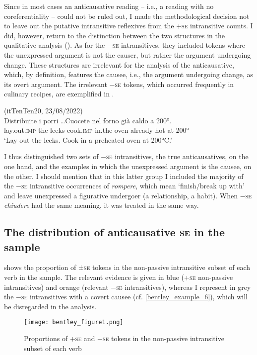 \documentclass[output=paper,colorlinks,citecolor=brown
]{langscibook}
\begin{document}
Since in most cases an anticausative reading – i.e., a reading with no coreferentiality – could not be ruled out, I made the methodological decision not to leave out the putative intransitive reflexives from the +\textsc{se} intransitive counts. I did, however, return to the distinction between the two structures in the qualitative analysis ().
As for the −\textsc{se} intransitives, they included tokens where the unexpressed argument is not the causer, but rather the argument undergoing change. These structures are irrelevant for the analysis of the anticausative, which, by definition, features the causee, i.e., the argument undergoing change, as its overt argument. The irrelevant −\textsc{se} tokens, which occurred frequently in culinary recipes, are exemplified in .


\ea \label{bentley_example_6}(itTenTen20, 23/08/2022)\\
\gll Distribuite i porri  \ldots Cuocete nel forno già caldo a 200°. \\
    lay.out.\textsc{imp}	the	leeks {} cook.\textsc{imp} in.the oven already hot at 200° \\
\glt ‘Lay out the leeks. Cook in a preheated oven at 200°C.’ 
\z

I thus distinguished two sets of −\textsc{se} intransitives, the true anticausatives, on the one hand, and the examples in which the unexpressed argument is the causee, on the other. I should mention that in this latter group I included the majority of the −\textsc{se} intransitive occurrences of \textit{rompere}, which mean ‘finish/break up with’ and leave unexpressed a figurative undergoer (a relationship, a habit). When −\textsc{se} \textit{chiudere} had the same meaning, it was treated in the same way. 

\subsection{The distribution of anticausative \textsc{se} in the sample}\label{bentley_section_3.2}
 shows the proportion of ±\textsc{se} tokens in the non-passive intransitive subset of each verb in the sample. The relevant evidence is given in blue (+\textsc{se} non-passive intransitives) and orange (relevant −\textsc{se} intransitives), whereas I represent in grey the −\textsc{se} intransitives with a covert causee (cf. \ref{bentley_example_6}), which will be disregarded in the analysis.

\begin{figure}
\texttt{[image: bentley\_figure1.png]}
\caption{\label{fig:bentley_figure_1}Proportions of +\textsc{se} and −\textsc{se} tokens in the non-passive intransitive subset of each verb}
\end{figure}    
\end{document}
